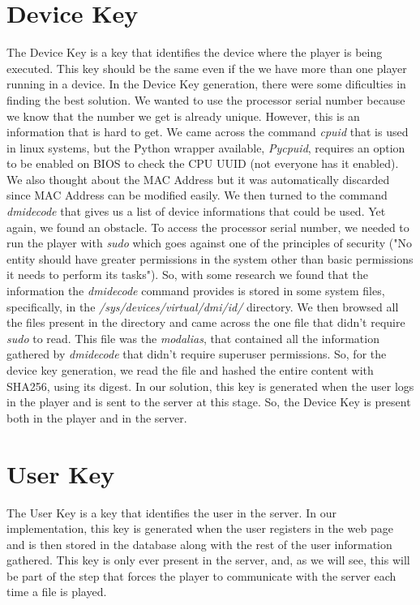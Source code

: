 \documentclass[11pt,a4paper]{report}
\begin{document}
\section{Device Key}
The Device Key is a key that identifies the device where the player is being executed. This key should be the same even if the we have more than one player running in a device.
In the Device Key generation, there were some dificulties in finding the best solution.
\newline We wanted to use the processor serial number because we know that the number we get is already unique.
However, this is an information that is hard to get. We came across the command \emph{cpuid} that is used in linux systems, but the Python wrapper available, \emph{Pycpuid}, requires an option to be enabled on BIOS to check the CPU UUID (not everyone has it enabled).
We also thought about the MAC Address but it was automatically discarded since MAC Address can be modified easily.
\newline We then turned to the command \emph{dmidecode} that gives us a list of device informations that could be used. 
Yet again, we found an obstacle. To access the processor serial number, we needed to run the player with \emph{sudo} which goes against one of the principles of security ("No entity should have greater permissions in the system other than basic permissions it needs to perform its tasks").
So, with some research we found that the information the \emph{dmidecode} command provides is stored in some system files, specifically, in the \emph{/sys/devices/virtual/dmi/id/} directory.
We then browsed all the files present in the directory and came across the one file that didn't require \emph{sudo} to read. 
This file was the \emph{modalias}, that contained all the information gathered by \emph{dmidecode} that didn't require superuser permissions.
\newline So, for the device key generation, we read the file and hashed the entire content with SHA256, using its digest.
\newline In our solution, this key is generated when the user logs in the player and is sent to the server at this stage. So, the Device Key is present both in the player and in the server.

\section{User Key}
The User Key is a key that identifies the user in the server. 
In our implementation, this key is generated when the user registers in the web page and is then stored in the database along with the rest of the user information gathered.
This key is only ever present in the server, and, as we will see, this will be part of the step that forces the player to communicate with the server each time a file is played.
\end{document}
